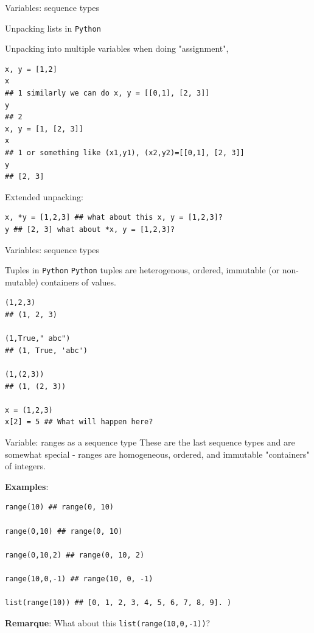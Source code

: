 \documentclass[10pt]{beamer}
\begin{document}
\begin{frame}[fragile]{Variables: sequence types}
\begin{block} {Unpacking lists in \texttt{Python}}
\vspace*{0.2cm}

Unpacking into multiple variables when doing "assignment",


\begin{lstlisting}[style=mypython]
x, y = [1,2]
x
## 1 similarly we can do x, y = [[0,1], [2, 3]]
y
## 2
x, y = [1, [2, 3]]
x
## 1 or something like (x1,y1), (x2,y2)=[[0,1], [2, 3]]
y
## [2, 3]
\end{lstlisting}
\vspace*{-0.2cm}
Extended unpacking:
\begin{lstlisting}[style=mypython]
x, *y = [1,2,3] ## what about this x, y = [1,2,3]? 
y ## [2, 3] what about *x, y = [1,2,3]?
\end{lstlisting}
\end{block}
\end{frame}

\begin{frame}[fragile]{Variables: sequence types}
\begin{block} {Tuples in \texttt{Python}}
\vspace*{0.1cm}
\texttt{Python} tuples are heterogenous, ordered, immutable (or non-mutable) containers of values.

\begin{lstlisting}[style=mypython]
(1,2,3)
## (1, 2, 3)

(1,True," abc")
## (1, True, 'abc')

(1,(2,3))
## (1, (2, 3))

x = (1,2,3)
x[2] = 5 ## What will happen here? 
\end{lstlisting}
\end{block}

\end{frame}


\begin{frame}[fragile]{Variable: ranges as a sequence type}
These are the last sequence types and are somewhat special - ranges are homogeneous, ordered, and immutable "containers" of integers.

\textbf{Examples}: 
\vspace{0.2cm}
\begin{lstlisting}[style=mypython]
range(10) ## range(0, 10)

range(0,10) ## range(0, 10)

range(0,10,2) ## range(0, 10, 2)

range(10,0,-1) ## range(10, 0, -1)

list(range(10)) ## [0, 1, 2, 3, 4, 5, 6, 7, 8, 9]. )
\end{lstlisting}

\textbf{Remarque}: What about this \texttt{list(range(10,0,-1))}?
\end{frame}
\end{document}
